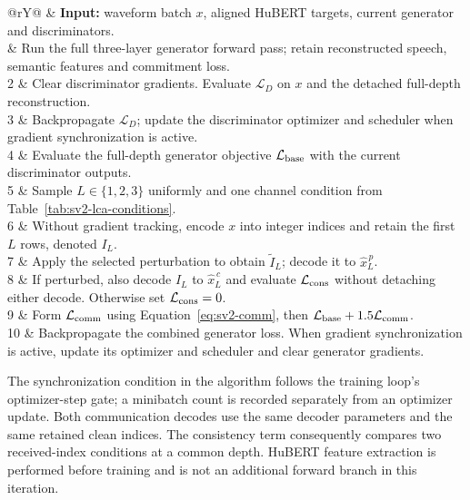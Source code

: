 \begin{algorithm}[t]
\caption{One SCIT-LCA minibatch}
\label{alg:sv3-lca}
\small
\begin{tabularx}{\columnwidth}{@{}rY@{}}
\toprule
 & \textbf{Input:} waveform batch $x$, aligned HuBERT targets, current generator and discriminators.\\
 & Run the full three-layer generator forward pass; retain reconstructed speech, semantic features and commitment loss.\\
2 & Clear discriminator gradients. Evaluate $\mathcal L_D$ on $x$ and the detached full-depth reconstruction.\\
3 & Backpropagate $\mathcal L_D$; update the discriminator optimizer and scheduler when gradient synchronization is active.\\
4 & Evaluate the full-depth generator objective $\mathcal L_{\rm base}$ with the current discriminator outputs.\\
5 & Sample $L\in\{1,2,3\}$ uniformly and one channel condition from Table~\ref{tab:sv2-lca-conditions}.\\
6 & Without gradient tracking, encode $x$ into integer indices and retain the first $L$ rows, denoted $I_L$.\\
7 & Apply the selected perturbation to obtain $\widetilde I_L$; decode it to $\hat x_L^{\,p}$.\\
8 & If perturbed, also decode $I_L$ to $\hat x_L^{\,c}$ and evaluate $\mathcal L_{\rm cons}$ without detaching either decode. Otherwise set $\mathcal L_{\rm cons}=0$.\\
9 & Form $\mathcal L_{\rm comm}$ using Equation~\ref{eq:sv2-comm}, then $\mathcal L_{\rm base}+1.5\mathcal L_{\rm comm}$.\\
10 & Backpropagate the combined generator loss. When gradient synchronization is active, update its optimizer and scheduler and clear generator gradients.\\
\bottomrule
\end{tabularx}
\end{algorithm}

The synchronization condition in the algorithm follows the training loop's optimizer-step gate; a minibatch count is recorded separately from an optimizer update. Both communication decodes use the same decoder parameters and the same retained clean indices. The consistency term consequently compares two received-index conditions at a common depth. HuBERT feature extraction is performed before training and is not an additional forward branch in this iteration.

